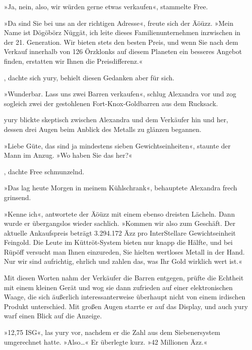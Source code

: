 »Ja, nein, also, wir würden gerne etwas verkaufen«, stammelte Free.

»Da sind Sie bei uns an der richtigen Adresse«, freute sich der Äöüzz. »Mein Name ist Dögöbörz Nüggät, ich leite dieses Familienunternehmen inzwischen in der 21. Generation. Wir bieten stets den besten Preis, und wenn Sie nach dem Verkauf innerhalb von 126 Örzklonks auf diesem Planeten ein besseres Angebot finden, erstatten wir Ihnen die Preisdifferenz.«

, dachte sich yury, behielt diesen Gedanken aber für sich.

»Wunderbar. Lass uns zwei Barren verkaufen«, schlug Alexandra vor und zog sogleich zwei der gestohlenen Fort-Knox-Goldbarren aus dem Rucksack.

yury blickte skeptisch zwischen Alexandra und dem Verkäufer hin und her, dessen drei Augen beim Anblick des Metalls zu glänzen begannen.

»Liebe Güte, das sind ja mindestens sieben Gewichtseinheiten«, staunte der Mann im Anzug. »Wo haben Sie das her?«

, dachte Free schmunzelnd. 

»Das lag heute Morgen in meinem Kühlschrank«, behauptete Alexandra frech grinsend.

»Kenne ich«, antwortete der Äöüzz mit einem ebenso dreisten Lächeln. Dann wurde er übergangslos wieder sachlich. »Kommen wir also zum Geschäft. Der aktuelle Ankaufspreis beträgt 3.294.172 Äzz pro InterStellare Gewichtseinheit Feingold. Die Leute im Küttröt-System bieten nur knapp die Hälfte, und bei Rüpöff versucht man Ihnen einzureden, Sie hielten wertloses Metall in der Hand. Nur wir sind aufrichtig, ehrlich und zahlen das, was Ihr Gold wirklich wert ist.«

Mit diesen Worten nahm der Verkäufer die Barren entgegen, prüfte die Echtheit mit einem kleinen Gerät und wog sie dann zufrieden auf einer elektronischen Waage, die sich äußerlich interessanterweise überhaupt nicht von einem irdischen Produkt unterschied. Mit großen Augen starrte er auf das Display, und auch yury warf einen Blick auf die Anzeige.

»12,75 ISG«, las yury vor, nachdem er die Zahl aus dem Siebenersystem umgerechnet hatte. »Also…« Er überlegte kurz. »42 Millionen Äzz.«

